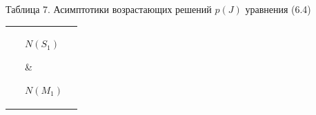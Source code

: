 \begin{center} 


Таблица 7. Асимптотики возрастающих решений $p(J)$ уравнения (6.4) 


\begin{tabular}{|p{2.6cm}|p{6.5cm}|p{6.5cm}|} 


\hline 


\ & \parbox{6.5cm}{\hspace*{27mm}$N(S_1)$} &\parbox{6.5cm}{\hspace*{27mm}$N(M_1)$}\\ 


\hline 


$\mu\le\mu_1$ & 


\parbox{6.5cm}{$p{\sim}(d_3p_1\sigma^{-1})^\lambda$, 


$J{\to}J_0+0$; $p{\sim} T^+_1(d_2)$, $J\to J_1-0$, 


$J_0\le J\le J_1$, $q(J_0)=\infty$, $q(J_1)=0$} & 


\parbox{6.5cm}{$p\sim J_0J^{k_1+\sigma}$, $J\to0$; 


$p\sim T^+_0(d_2)$, $J\to J_1-0$; $0\le J\le J_1$, 


$q_0=0$, $q(J_1)=\infty$} \\ 


\hline 


$\mu>\mu_2$ & 


\parbox{6.5cm}{$p\sim J_0J^{-1/2\chi}$, $J\to0$; 


$p\sim J_1J^{k_1+\sigma}$, $J\to\infty$; 


$0\le J<\infty$, $q_0=\infty$,\\ $q(\infty)=\theta_1(\mu)$} & 


\parbox{6.5cm}{$p\sim\tau(A)p^{-1/2\chi}_1$, $J\to J_0+0$; 


$p\sim J_1J^{k_1+\sigma}$, $J\to\infty$; 


$J_0\le J<\infty$,\\ $q(J_0)=\infty$, $q(\infty)=\theta_1(\mu)$}\\ 


\hline 


\ & \parbox{6.5cm}{\hspace*{27mm}$N(S_2)$} & 


\parbox{6.5cm}{\hspace*{27mm}$N(M_2)$} \\ 


\hline 


$\mu<\mu_2$ & 


\parbox{6.5cm}{$p\sim J_0J^{-1/2\chi}$, $J\to0$; 


}
\end{tabular}
\end{center}
